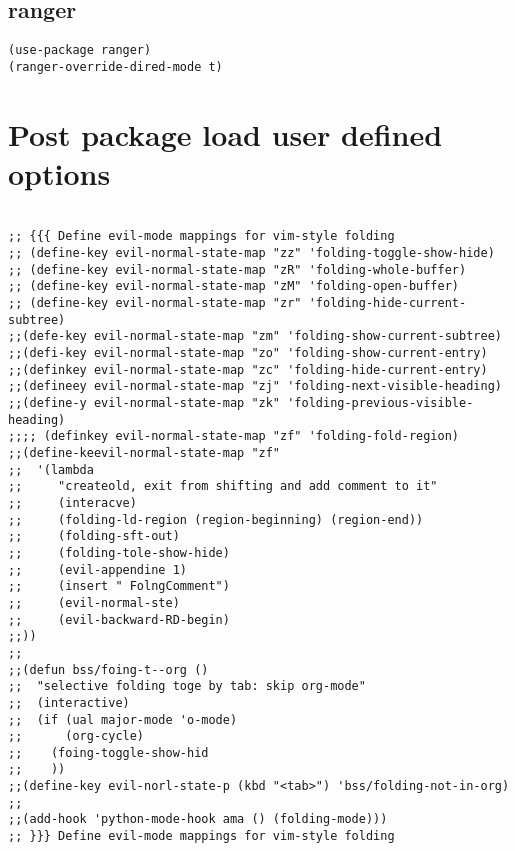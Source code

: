 \documentclass[11pt]{article}
\begin{document}
\subsection{ranger}
\label{sec:org750a33c}
\begin{verbatim}
(use-package ranger)
(ranger-override-dired-mode t)
\end{verbatim}
\section{Post package load user defined options}
\label{sec:org092a84b}
\begin{verbatim}

;; {{{ Define evil-mode mappings for vim-style folding
;; (define-key evil-normal-state-map "zz" 'folding-toggle-show-hide)
;; (define-key evil-normal-state-map "zR" 'folding-whole-buffer)
;; (define-key evil-normal-state-map "zM" 'folding-open-buffer)
;; (define-key evil-normal-state-map "zr" 'folding-hide-current-subtree)
;;(defe-key evil-normal-state-map "zm" 'folding-show-current-subtree)
;;(defi-key evil-normal-state-map "zo" 'folding-show-current-entry)
;;(definkey evil-normal-state-map "zc" 'folding-hide-current-entry)
;;(defineey evil-normal-state-map "zj" 'folding-next-visible-heading)
;;(define-y evil-normal-state-map "zk" 'folding-previous-visible-heading)
;;;; (definkey evil-normal-state-map "zf" 'folding-fold-region)
;;(define-keevil-normal-state-map "zf"
;;  '(lambda 
;;     "createold, exit from shifting and add comment to it"
;;     (interacve)
;;     (folding-ld-region (region-beginning) (region-end))
;;     (folding-sft-out)
;;     (folding-tole-show-hide)
;;     (evil-appendine 1)
;;     (insert " FolngComment")
;;     (evil-normal-ste)
;;     (evil-backward-RD-begin)
;;))
;;
;;(defun bss/foing-t--org ()
;;  "selective folding toge by tab: skip org-mode"
;;  (interactive)
;;  (if (ual major-mode 'o-mode)
;;      (org-cycle)
;;    (foing-toggle-show-hid
;;    ))
;;(define-key evil-norl-state-p (kbd "<tab>") 'bss/folding-not-in-org)
;;
;;(add-hook 'python-mode-hook ama () (folding-mode)))
;; }}} Define evil-mode mappings for vim-style folding

\end{verbatim}
\end{document}
